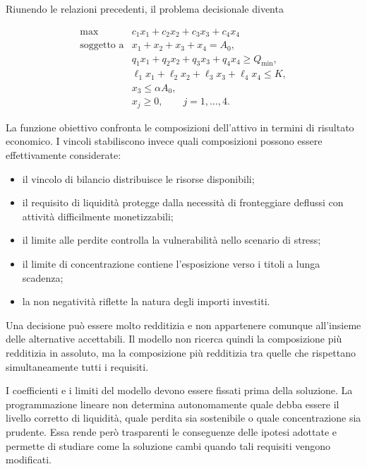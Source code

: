 Riunendo le relazioni precedenti, il problema decisionale diventa

\[
\begin{array}{ll}
\max
&
c_1x_1+c_2x_2+c_3x_3+c_4x_4
\\[6pt]
\mbox{soggetto a}
&
x_1+x_2+x_3+x_4=A_0,
\\[4pt]
&
q_1x_1+q_2x_2+q_3x_3+q_4x_4
\geq Q_{\min},
\\[4pt]
&
\ell_1x_1+\ell_2x_2+\ell_3x_3+\ell_4x_4
\leq K,
\\[4pt]
&
x_3\leq\alpha A_0,
\\[4pt]
&
x_j\geq0,
\qquad j=1,\ldots,4.
\end{array}
\]

La funzione obiettivo confronta le composizioni dell'attivo in termini di
risultato economico. I vincoli stabiliscono invece quali composizioni possono
essere effettivamente considerate:

\begin{itemize}

\item il vincolo di bilancio distribuisce le risorse disponibili;

\item il requisito di liquidit\`a protegge dalla necessit\`a di fronteggiare
deflussi con attivit\`a difficilmente monetizzabili;

\item il limite alle perdite controlla la vulnerabilit\`a nello scenario di
stress;

\item il limite di concentrazione contiene l'esposizione verso i titoli a
lunga scadenza;

\item la non negativit\`a riflette la natura degli importi investiti.

\end{itemize}

Una decisione pu\`o essere molto redditizia e non appartenere comunque
all'insieme delle alternative accettabili. Il modello non ricerca quindi la
composizione pi\`u redditizia in assoluto, ma la composizione pi\`u redditizia
tra quelle che rispettano simultaneamente tutti i requisiti.

I coefficienti e i limiti del modello devono essere fissati prima della
soluzione. La programmazione lineare non determina autonomamente quale debba
essere il livello corretto di liquidit\`a, quale perdita sia sostenibile o
quale concentrazione sia prudente. Essa rende per\`o trasparenti le
conseguenze delle ipotesi adottate e permette di studiare come la soluzione
cambi quando tali requisiti vengono modificati.

